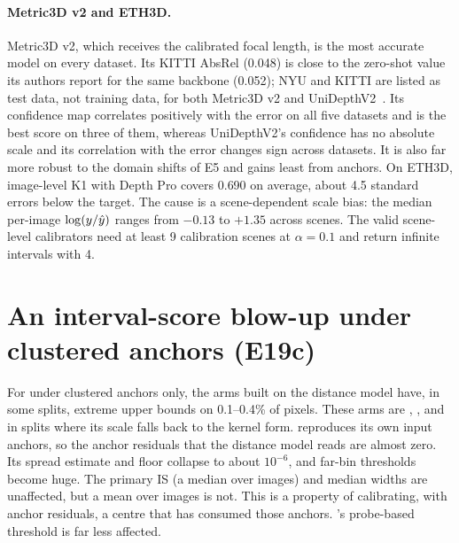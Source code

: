 \paragraph{Metric3D v2 and ETH3D.}
Metric3D v2, which receives the calibrated focal length, is the most accurate model on every dataset.
Its KITTI AbsRel (0.048) is close to the zero-shot value its authors report for the same backbone (0.052); NYU and KITTI are listed as test data, not training data, for both Metric3D v2 and UniDepthV2~\cite{hu2024metric3dv2,piccinelli2025unidepthv2}.
Its confidence map correlates positively with the error on all five datasets and is the best score on three of them, whereas UniDepthV2's confidence has no absolute scale and its correlation with the error changes sign across datasets.
It is also far more robust to the domain shifts of E5 and gains least from anchors.
On ETH3D, image-level K1 with Depth Pro covers 0.690 on average, about 4.5 standard errors below the target.
The cause is a scene-dependent scale bias: the median per-image $\log(y/\hat{y})$ ranges from $-0.13$ to $+1.35$ across scenes.
The valid scene-level calibrators need at least 9 calibration scenes at $\alpha=0.1$ and return infinite intervals with 4.

\section{An interval-score blow-up under clustered anchors (E19c)}
\label{app:blowup}
For \omnidc under clustered anchors only, the arms built on the distance model have, in some splits, extreme upper bounds on 0.1--0.4\% of pixels.
These arms are \mDistSplit, \mDualBoth, and \mDual in splits where its scale falls back to the kernel form.
\omnidc reproduces its own input anchors, so the anchor residuals that the distance model reads are almost zero.
Its spread estimate and floor collapse to about $10^{-6}$, and far-bin thresholds become huge.
The primary IS (a median over images) and median widths are unaffected, but a mean over images is not.
This is a property of calibrating, with anchor residuals, a centre that has consumed those anchors.
\mDual's probe-based threshold is far less affected.


